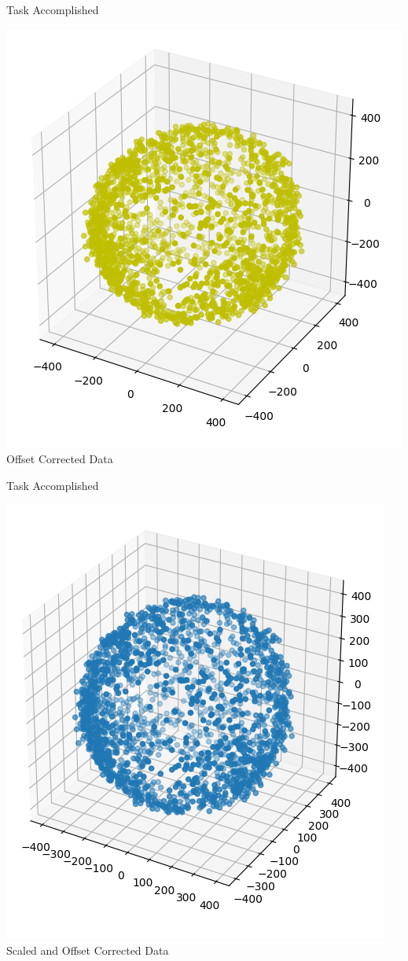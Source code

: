 \documentclass[10pt, a4paper]{beamer}
\begin{document}
\begin{frame}{Task Accomplished}
\begin{center}
\includegraphics[scale=0.45]{offset}\\
Offset Corrected Data
\end{center}
\end{frame}

\begin{frame}{Task Accomplished}
\begin{center}
\includegraphics[scale=0.45]{scaled}\\
Scaled and Offset Corrected Data
\end{center}
\end{frame}
\end{document}
